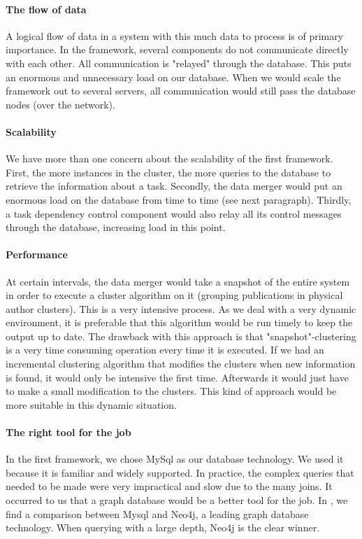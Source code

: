 \paragraph{The flow of data} A logical flow of data in a system with this much data to process is of primary importance. In the framework, several components do not communicate directly with each other. All communication is "relayed" through the database. This puts an enormous and unnecessary load on our database. When we would scale the framework out to several servers, all communication would still pass the database nodes (over the network).

\paragraph{Scalability} We have more than one concern about the scalability of the first framework. First, the more instances in the cluster, the more queries to the database to retrieve the information about a task. Secondly, the data merger would put an enormous load on the database from time to time (see next paragraph). Thirdly, a task dependency control component would also relay all its control messages through the database, increasing load in this point.

\paragraph{Performance} At certain intervals, the data merger would take a snapshot of the entire system in order to execute a cluster algorithm on it (grouping publications in physical author clusters). This is a very intensive process. As we deal with a very dynamic environment, it is preferable that this algorithm would be run timely to keep the output up to date. The drawback with this approach is that "snapshot"-clustering is a very time consuming operation every time it is executed. If we had an incremental clustering algorithm that modifies the clusters when new information is found, it would only be intensive the first time. Afterwards it would just have to make a small modification to the clusters. This kind of approach would be more suitable in this dynamic situation.

\paragraph{The right tool for the job} In the first framework, we chose MySql as our database technology. We used it because it is familiar and widely supported. In practice, the complex queries that needed to be made were very impractical and slow due to the many joins. It occurred to us that a graph database would be a better tool for the job. In \cite{vicknair2010comparison}, we find a comparison between Mysql and Neo4j, a leading graph database technology. When querying with a large depth, Neo4j is the clear winner.

